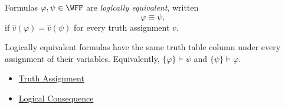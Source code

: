 \begin{tcolorbox}[colback=propbox, colframe=propborder, arc=2pt,
  left=6pt, right=6pt, top=4pt, bottom=4pt,
  title={\small\textbf{Definition (Logical Equivalence)}},
  fonttitle=\small\bfseries]
\label{def:logical-equivalence-propositional-logic}
Formulas $\varphi,\psi\in\WFF$ are \emph{logically equivalent}, written
\[
\varphi\equiv\psi,
\]
if $\widehat v(\varphi)=\widehat v(\psi)$ for every truth assignment $v$.
\end{tcolorbox}

\begin{remark*}[Interpretation]
Logically equivalent formulas have the same truth table column under every
assignment of their variables. Equivalently, $\{\varphi\}\models\psi$ and
$\{\psi\}\models\varphi$.
\end{remark*}

\begin{dependencies}
\begin{itemize}
  \item \hyperref[def:truth-assignment-propositional-logic]{Truth Assignment}
  \item \hyperref[def:logical-consequence-propositional-logic]{Logical Consequence}
\end{itemize}
\end{dependencies}
